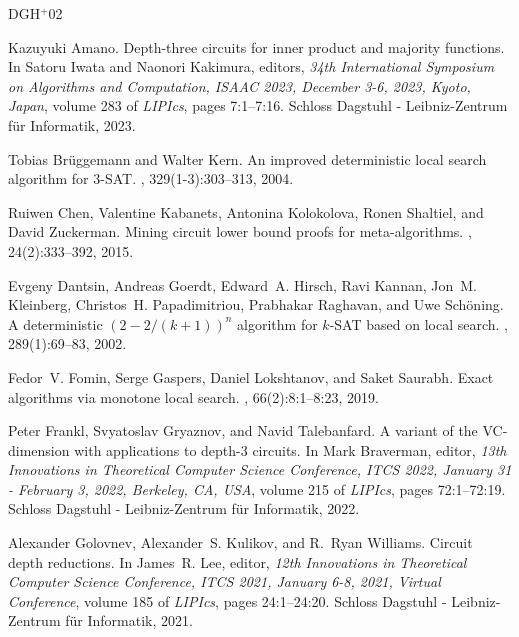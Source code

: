 \documentclass[10pt,a4paper]{article}
\begin{document}
\newcommand{\etalchar}[1]{$^{#1}$}
\begin{thebibliography}{DGH{\etalchar{+}}02}

Kazuyuki Amano.
\newblock Depth-three circuits for inner product and majority functions.
\newblock In Satoru Iwata and Naonori Kakimura, editors, {\em 34th
  International Symposium on Algorithms and Computation, {ISAAC} 2023, December
  3-6, 2023, Kyoto, Japan}, volume 283 of {\em LIPIcs}, pages 7:1--7:16.
  Schloss Dagstuhl - Leibniz-Zentrum f{\"{u}}r Informatik, 2023.

Tobias Br{\"{u}}ggemann and Walter Kern.
\newblock An improved deterministic local search algorithm for $3$-{SAT}.
, 329(1-3):303--313, 2004.

\bibitem[CKK{\etalchar{+}}15]{ChenKKSZ15}
Ruiwen Chen, Valentine Kabanets, Antonina Kolokolova, Ronen Shaltiel, and David
  Zuckerman.
\newblock Mining circuit lower bound proofs for meta-algorithms.
, 24(2):333--392, 2015.

\bibitem[DGH{\etalchar{+}}02]{DantsinGHKKPRS02}
Evgeny Dantsin, Andreas Goerdt, Edward~A. Hirsch, Ravi Kannan, Jon~M.
  Kleinberg, Christos~H. Papadimitriou, Prabhakar Raghavan, and Uwe
  Sch{\"{o}}ning.
\newblock A deterministic $(2-2/(k+1))^n$ algorithm for $k$-{SAT} based on
  local search.
, 289(1):69--83, 2002.

Fedor~V. Fomin, Serge Gaspers, Daniel Lokshtanov, and Saket Saurabh.
\newblock Exact algorithms via monotone local search.
, 66(2):8:1--8:23, 2019.

Peter Frankl, Svyatoslav Gryaznov, and Navid Talebanfard.
\newblock A variant of the {VC}-dimension with applications to depth-3
  circuits.
\newblock In Mark Braverman, editor, {\em 13th Innovations in Theoretical
  Computer Science Conference, {ITCS} 2022, January 31 - February 3, 2022,
  Berkeley, CA, {USA}}, volume 215 of {\em LIPIcs}, pages 72:1--72:19. Schloss
  Dagstuhl - Leibniz-Zentrum f{\"{u}}r Informatik, 2022.

Alexander Golovnev, Alexander~S. Kulikov, and R.~Ryan Williams.
\newblock Circuit depth reductions.
\newblock In James~R. Lee, editor, {\em 12th Innovations in Theoretical
  Computer Science Conference, {ITCS} 2021, January 6-8, 2021, Virtual
  Conference}, volume 185 of {\em LIPIcs}, pages 24:1--24:20. Schloss Dagstuhl
  - Leibniz-Zentrum f{\"{u}}r Informatik, 2021.


\end{thebibliography}
\end{document}
